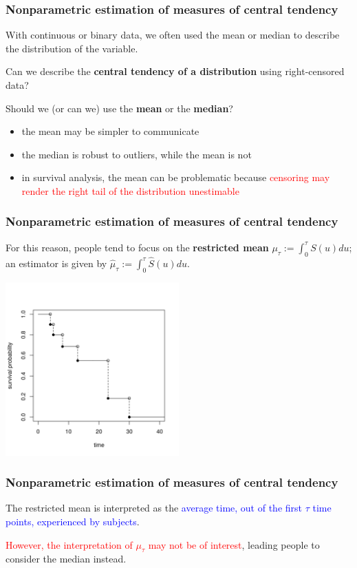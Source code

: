 \documentclass[12pt, 
hyperref={colorlinks=true, linkcolor=blue, urlcolor=cyan},dvipsnames]{beamer}
\begin{document}
\begin{frame}
\frametitle{Nonparametric estimation of measures of central tendency}

With continuous or binary data, we often used the mean or median to describe the distribution of the variable.

Can we describe the \textbf{central tendency of a distribution} using right-censored data?

Should we (or can we) use the \textbf{mean} or the \textbf{median}?
\begin{itemize}
\item the mean may be simpler to communicate
\item the median is robust to outliers, while the mean is not
\item in survival analysis, the mean can be problematic because \textcolor{red}{censoring may render the right tail of the distribution unestimable}
\end{itemize}
\end{frame}

\begin{frame}
\frametitle{Nonparametric estimation of measures of central tendency}

For this reason, people tend to focus on the \textbf{restricted mean} $\mu_\tau := \int_0^\tau S(u) du$; an estimator is given by $\widehat{\mu}_\tau := \int_0^\tau \widehat{S}(u)du$.\vspace{-0.6cm}

\begin{center}
\includegraphics[width=0.5\textwidth]{figs/km_small_example.png}
\end{center}\vspace{-0.6cm}
\end{frame}

\begin{frame}
\frametitle{Nonparametric estimation of measures of central tendency}
The restricted mean is interpreted as the \textcolor{blue}{average time, out of the first $\tau$ time points, experienced by subjects}.

\textcolor{red}{However, the interpretation of $\mu_\tau$ may not be of interest}, leading people to consider the median instead.
\end{frame}
\end{document}
